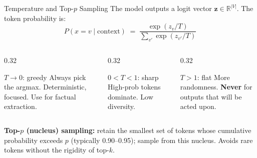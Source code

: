 \documentclass[11pt,aspectratio=169,professionalfonts]{beamer}
\begin{document}
%
%
\begin{frame}{Temperature and Top-$p$ Sampling}
  The model outputs a logit vector $\mathbf{z}\in\mathbb{R}^{|V|}$.
  The token probability is:
  \[
    P(x=v\mid\text{context})
    \;=\;
    \frac{\exp(z_v/T)}{\displaystyle\sum_{v'}\exp(z_{v'}/T)}
  \]

  \begin{columns}[T]
    \begin{column}{0.32\linewidth}
      \begin{block}{$T\to 0$: greedy}
        Always pick the argmax.
        Deterministic, focused.
        Use for factual extraction.
      \end{block}
    \end{column}
    \begin{column}{0.32\linewidth}
      \begin{block}{$0{<}T{<}1$: sharp}
        High-prob tokens dominate.
        Low diversity.
      \end{block}
    \end{column}
    \begin{column}{0.32\linewidth}
      \begin{alertblock}{$T{>}1$: flat}
        More randomness.
        \textbf{Never} for outputs that will be acted upon.
      \end{alertblock}
    \end{column}
  \end{columns}
  \vspace{0.5em}
  \textbf{Top-$p$ (nucleus) sampling:} retain the smallest set of tokens
  whose cumulative probability exceeds $p$ (typically 0.90--0.95);
  sample from this nucleus.
  Avoids rare tokens without the rigidity of top-$k$.
\end{frame}
%
%
\end{document}
